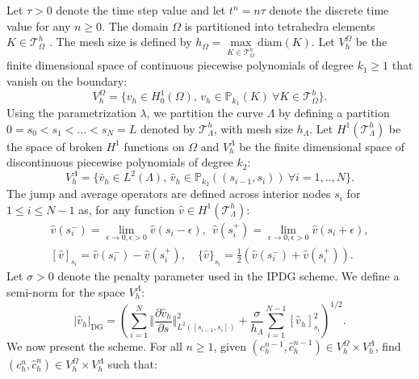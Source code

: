 \documentclass[pdflatex,sn-mathphys-num]{sn-jnl}%
\newcommand{\DG}{\mathrm{DG}}
\theoremstyle{thmstyleone}%
\theoremstyle{thmstyletwo}%
\theoremstyle{thmstylethree}%
\begin{document}
Let $\tau>0$ denote the time step value and
let $t^n = n \tau$ denote the discrete time value for any $n\geq 0$.
The domain $\Omega$ is partitioned into tetrahedra elements $ K \in \mathcal{T}^h_\Omega$ . The mesh size is defined by $h_\Omega = \max\limits_{K \in \mathcal{T}^h_\Omega} \mathrm{diam}(K)$. Let $V^\Omega_h$ be the finite dimensional space of continuous piecewise polynomials of degree $k_1\geq 1$ that vanish on the boundary:
\[
V^\Omega_h = \{v_h \in H_0^1(\Omega), \, v_h \in \mathbb{P}_{k_1}(K) \ \forall K \in \mathcal{T}^h_\Omega\}.
\]
Using the parametrization $\lambda$, we partition the curve $\Lambda$ by defining a partition $0=s_0<s_1<\dots<s_N=L$ denoted by $\mathcal{T}_\Lambda^h$,  with mesh size $h_\Lambda$.  
Let $H^1(\mathcal{T}^h_\Lambda)$ be the space of broken $H^1$ functions on $\Omega$ and $V^\Lambda_h$ be the finite dimensional space of discontinuous piecewise polynomials of degree $k_2:$
\[
V^\Lambda_h = \{\hat{v}_h \in L^2(\Lambda), \, \hat{v}_h \in \mathbb{P}_{k_2}((s_{i-1},s_i)) \ \forall i = 1, .., N\}.
\] 
The jump and average operators are defined across interior nodes $s_i$ for $1\leq i \leq N-1$ as, for any function $\hat v\in H^1(\mathcal{T}_\Lambda^h)$:
\begin{align*}
  \hat v(s_i^-) =  \lim_{\epsilon \rightarrow0, \epsilon>0} \hat v(s_i-\epsilon),\ \   \hat v(s_i^+) =  \lim_{\epsilon \rightarrow0, \epsilon>0} \hat v(s_i+\epsilon),\\
[\hat v]_{s_i}= \hat v(s_i^-) -\hat v(s_i^+), \quad \{\hat v\}_{s_i}=\frac{1}{2}\left(\hat v(s_i^-) +\hat v(s_i^+)\right).
\end{align*}
Let $\sigma>0$ denote the penalty parameter used in the IPDG scheme. 
We define a semi-norm for the space $V_h^\Lambda$:
\[
\vert \hat v_h \vert_{\DG} = \left(
\sum_{i=1}^N \Vert \frac{\partial \hat v_h}{\partial s}\Vert_{L^2([s_{i-1},s_i])}^2
+ \frac{\sigma}{h_\Lambda} \sum_{i=1}^{N-1} [\hat v_h]_{s_i}^2 \right)^{1/2}.
\]
We now present the scheme. 
For all $n\geq 1$, given $(c_h^{n-1}, \hat c_h^{n-1})\in V_h^\Omega\times V_h^\Lambda$, find $(c_h^{n}, \hat c_h^{n}) \in V_h^\Omega\times V_h^\Lambda$ such that:
%
\end{document}
